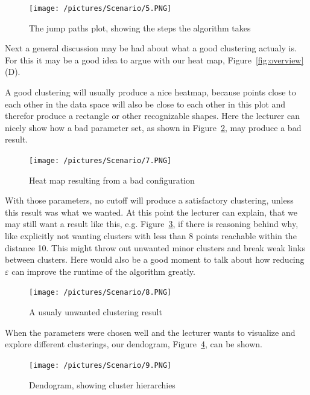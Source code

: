 \documentclass{vgtc} %
\begin{document}
\begin{figure}[tb]
    \centering
    \texttt{[image: /pictures/Scenario/5.PNG]}
    \caption{The jump paths plot, showing the steps the algorithm takes}
    \label{fig:jump-paths}
\end{figure}

Next a general discussion may be had about what a good clustering actualy is. For this it may be a good idea to argue with our heat map, Figure~\ref{fig:overview} (D).

A good clustering will usually produce a nice heatmap, because points close to each other in the data space will also be close to each other in this plot and therefor produce a rectangle or other recognizable shapes. Here the lecturer can nicely show how a bad parameter set, as shown in Figure~\ref{fig:heatmap-bad},  may produce a bad result.

\begin{figure}[tb]
    \centering
    \texttt{[image: /pictures/Scenario/7.PNG]}
    \caption{Heat map resulting from a bad configuration}
    \label{fig:heatmap-bad}
\end{figure}

With those parameters, no cutoff will produce a satisfactory clustering, unless this result was what we wanted. At this point the lecturer can explain, that we may still want a result like this, e.g. Figure~\ref{fig:bad-param-set}, if there is reasoning behind why, like explicitly not wanting clusters with less than 8 points reachable within the distance 10. This might throw out unwanted minor clusters and break weak links between clusters. Here would also be a good moment to talk about how reducing $\varepsilon$ can improve the runtime of the algorithm greatly.

\begin{figure}[tb]
    \centering
    \texttt{[image: /pictures/Scenario/8.PNG]}
    \caption{A usualy unwanted clustering result}
    \label{fig:bad-param-set}
\end{figure}

When the parameters were chosen well and the lecturer wants to visualize and explore different clusterings, our dendogram, Figure~\ref{fig:dendogram}, can be shown.

\begin{figure}[tb]
    \centering
    \texttt{[image: /pictures/Scenario/9.PNG]}
    \caption{Dendogram, showing cluster hierarchies}
    \label{fig:dendogram}
\end{figure}
\end{document}
